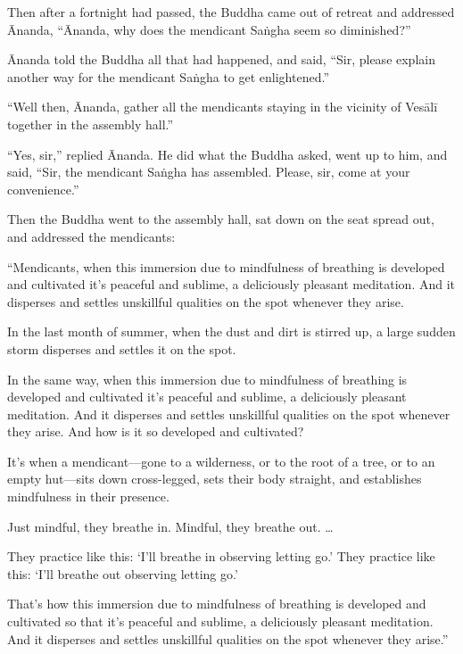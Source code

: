 \documentclass[12pt,openany]{book}%
\begin{document}
Then after a fortnight had passed, the Buddha came out of retreat and addressed Ānanda, “Ānanda, why does the mendicant \textsanskrit{Saṅgha} seem so diminished?” 

Ānanda told the Buddha all that had happened, and said, “Sir, please explain another way for the mendicant \textsanskrit{Saṅgha} to get enlightened.” 

“Well then, Ānanda, gather all the mendicants staying in the vicinity of \textsanskrit{Vesālī} together in the assembly hall.” 

“Yes, sir,” replied Ānanda. He did what the Buddha asked, went up to him, and said, “Sir, the mendicant \textsanskrit{Saṅgha} has assembled. Please, sir, come at your convenience.” 

Then the Buddha went to the assembly hall, sat down on the seat spread out, and addressed the mendicants: 

“Mendicants, when this immersion due to mindfulness of breathing is developed and cultivated it’s peaceful and sublime, a deliciously pleasant meditation. And it disperses and settles unskillful qualities on the spot whenever they arise. 

In the last month of summer, when the dust and dirt is stirred up, a large sudden storm disperses and settles it on the spot. 

In the same way, when this immersion due to mindfulness of breathing is developed and cultivated it’s peaceful and sublime, a deliciously pleasant meditation. And it disperses and settles unskillful qualities on the spot whenever they arise. And how is it so developed and cultivated? 

It’s when a mendicant—gone to a wilderness, or to the root of a tree, or to an empty hut—sits down cross-legged, sets their body straight, and establishes mindfulness in their presence. 

Just mindful, they breathe in. Mindful, they breathe out. … 

They practice like this: ‘I’ll breathe in observing letting go.’ They practice like this: ‘I’ll breathe out observing letting go.’ 

That’s how this immersion due to mindfulness of breathing is developed and cultivated so that it’s peaceful and sublime, a deliciously pleasant meditation. And it disperses and settles unskillful qualities on the spot whenever they arise.” 
\end{document}
